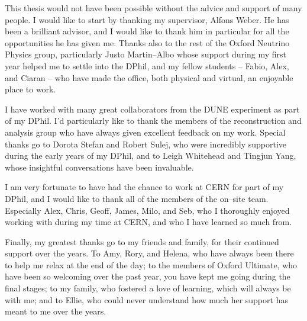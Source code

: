 This thesis would not have been possible without the advice and support of many
people. I would like to start by thanking my supervisor, Alfons Weber. He has
been a brilliant advisor, and I would like to thank him in particular for all
the opportunities he has given me. Thanks also to the rest of the Oxford
Neutrino Physics group, particularly Justo Martin--Albo whose support during 
my first year helped me to settle into the DPhil, and my fellow students -- 
Fabio, Alex, and Ciaran -- who have made the office, both physical and 
virtual, an enjoyable place to work.

\bigskip\noindent
I have worked with many great collaborators from the DUNE experiment
as part of my DPhil. I'd particularly like to thank the members of the 
\protodune{} reconstruction and analysis group who have always given 
excellent feedback on my work. Special thanks go to Dorota Stefan and Robert 
Sulej, who were incredibly supportive during the early years of my DPhil, and 
to Leigh Whitehead and Tingjun Yang, whose insightful conversations have been 
invaluable. 

\bigskip\noindent
I am very fortunate to have had the chance to work at CERN for part of my DPhil,
and I would like to thank all of the members of the on--site \protodune{} 
team. Especially Alex, Chris, Geoff, James, Milo, and Seb, who I thoroughly 
enjoyed working with during my time at CERN, and who I have learned so much 
from. 

\bigskip\noindent
Finally, my greatest thanks go to my friends and family, for their continued
support over the years. To Amy, Rory, and Helena, who have always been there to
help me relax at the end of the day; to the members of Oxford Ultimate, who have
been so welcoming over the past year, you have kept me going during the final 
stages; to my family, who fostered a love of learning, which will always be 
with me; and to Ellie, who could never understand how much her support has 
meant to me over the years.
